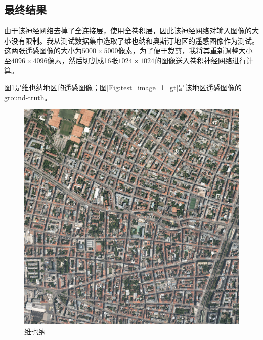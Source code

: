 \subsection{最终结果}

由于该神经网络去掉了全连接层，使用全卷积层，因此该神经网络对输入图像的大小没有限制。我从测试数据集中选取了维也纳和奥斯汀地区的遥感图像作为测试。这两张遥感图像的大小为$5000\times 5000$像素，为了便于裁剪，我将其重新调整大小至$4096\times 4096$像素，然后切割成16张$1024\times 1024$的图像送入卷积神经网络进行计算。

图\ref{Fig:test_image_1}是维也纳地区的遥感图像；图\ref{Fig:test_image_1_gt}是该地区遥感图像的ground-truth。
\begin{figure}[htbp]
    
    \centering
    \begin{minipage}[t]{0.49\linewidth}
        \centering
        \includegraphics[width=1\linewidth]{Figures/结果/vienna8.png}
        \caption{维也纳}
        \label{Fig:test_image_1}
    \end{minipage}
    \begin{minipage}[t]{0.49\linewidth}
        \centering

\end{minipage}
\end{figure}
